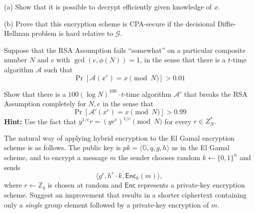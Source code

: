 \documentclass[12pt,letterpaper,boxed]{amspset}
\begin{document}
\begin{solution}
(a) Show that it is possible to decrypt efficiently given knowledge of $x$.
\vspace{5cm}

\noindent (b) Prove that this encryption scheme is CPA-secure if the decisional Diffie-Hellman problem is hard relative to $\mathcal{G}$.
\vspace{10cm}

\end{solution}

\begin{problem}[10.5]
Suppose that the RSA Assumption fails
``somewhat'' on a particular composite number $N$ and $e$ with
$\gcd(e,\phi(N))=1$, in the sense that there is a $t$-time
algorithm $\mathcal{A}$ such that
\[
\Pr[ \mathcal{A}(x^e) = x \pmod{N} ] > 0.01
\]

Show that there is a $100(\log N)^{100} \cdot t$-time algorithm
$\mathcal{A}'$ that breaks the RSA Assumption completely for $N,e$ in the
sense that
\[
\Pr[ \mathcal{A}'(x^e)= x \pmod{N} ] > 0.99
\]
\textbf{Hint:} Use the fact
that $y^{1/e}r = (yr^e)^{1/e} \pmod{N}$ for every $r \in Z^*_N$.
\end{problem}

\begin{solution}
\vspace{5cm}

\end{solution}

\begin{problem}[10.6]
The natural way of applying hybrid encryption to the El Gamal encryption scheme is as follows. The public key is $pk = \langle \mathbb{G},q,g,h\rangle $ as in the El Gamal scheme, and to encrypt a message $m$ the sender chooses random $k \gets \{0,1\}^n$ and sends
\[ \langle g^r, h^r\cdot k, \mathsf{Enc}_k(m)\rangle, \]
where $r\gets \mathbb{Z}_q$ is chosen at random and $\mathsf{Enc}$ represents a private-key encryption scheme. Suggest an improvement that results in a shorter ciphertext containing only a \emph{single} group element followed by a private-key encryption of $m$.
\end{problem}

\begin{solution}
\vspace{5cm}

\end{solution}
\end{document}

